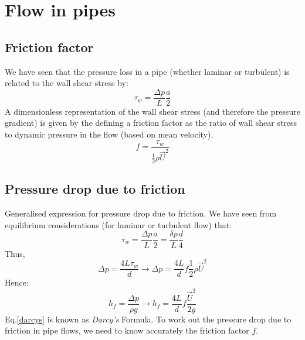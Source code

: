 \documentclass[class=report, crop=false, 12pt,a4paper]{standalone}
\begin{document}
\section{Flow in pipes}
\subsection{Friction factor}
We have seen that the pressure loss in a pipe (whether laminar or turbulent) is related to the wall shear stress by:
\begin{equation}
  \tau_w = \frac{\Delta p}{L}\frac{a}{2}
\end{equation}
A dimensionless representation of the wall shear stress (and therefore the pressure gradient) is given by the defining a friction factor as the ratio of wall shear stress to dynamic pressure in the flow (based on mean velocity).
\begin{equation}
  f = \frac{\tau_w}{\frac{1}{2}\rho \vec{U}^2}
\end{equation}
\subsection{Pressure drop due to friction}
Generalised expression for pressure drop due to friction. We have seen from equilibrium considerations (for laminar or turbulent flow) that: 
\begin{equation}
  \tau_w = \frac{\Delta p}{L} \frac{a}{2} = \frac{\delta p}{L} \frac{d}{4}
\end{equation}
Thus,
\begin{equation}
  \Delta p = \frac{4L\tau_w}{d}\rightarrow \Delta p =\frac{4L}{d} f \frac{1}{2} \rho \vec{U}^2
\end{equation}
Hence:
\begin{equation}
  h_f = \frac{\Delta p}{\rho g} \rightarrow h_f = \frac{4L}{d} f \frac{\vec{U}^2}{2g} \label{darcys}
\end{equation}
Eq.\ref{darcys} is known as \textit{Darcy's} Formula. To work out the pressure drop due to friction in pipe flows, we need to know accurately the friction factor $f$.
\end{document}
